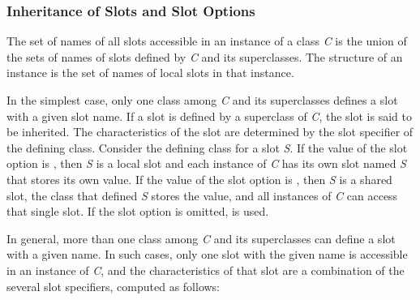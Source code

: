 \subsubsection{Inheritance of Slots and Slot Options}
\label{Inheritance-of-Slots-and-Slot-Options-SECTION}

The set of names of all slots accessible in an instance of a class
{\it C} is the union of the sets of names of slots defined by {\it C} and its
superclasses. The {\bit structure} of an instance is the set of names
of local slots in that instance.

In the simplest case, only one class among {\it C} and its superclasses
defines a slot with a given slot name.  If a slot is defined by a
superclass of {\it C}, the slot is said to be {\bit
inherited}.  The characteristics of the slot are determined by the
slot specifier of the defining class.  Consider the defining class for
a slot {\it S}.  If the value of the  slot
option is , then {\it S} is a local slot and each instance
of {\it C} has its own slot named {\it S} that stores its own value.  If the
value of the  slot option is , then {\it S}
is a shared slot, the class that defined {\it S} stores the value, and all
instances of {\it C} can access that single slot.  If the 
 slot option is omitted,  is used.

In general, more than one class among {\it C} and its superclasses can
define a slot with a given name.  In such cases, only one slot with
the given name is accessible in an instance of {\it C}, and
the characteristics of that slot are a combination of the several slot
specifiers, computed as follows:

